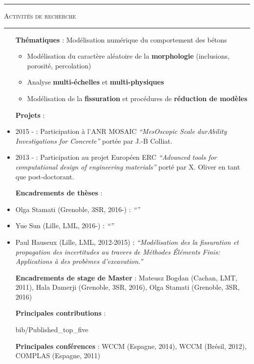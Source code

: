 \documentclass[a4paper,11pt]{article}
\newcommand{\titre}[1]{
  \begin{center}
    \rule{0.4\textwidth}{0.5pt}
    \par\vspace{0.1cm}
    \textsc{\large #1}
    \par\vspace{-0.2cm}
    \par\noindent\rule{0.4\textwidth}{0.5pt}
  \end{center}
}
\begin{document}
\newpage
\titre{Activités de recherche}
\begin{itemize}
  \item[\textbf{Thématiques}] : Modélisation numérique du comportement des bétons
    \begin{itemize}
    \item Modélisation du caractère aléatoire de la \textbf{morphologie} (inclusions, porosité, percolation)
    \item Analyse \textbf{multi-échelles} et \textbf{multi-physiques}
    \item Modélisation de la \textbf{fissuration} et procédures de \textbf{réduction de modèles}
    \end{itemize}
  \item[\textbf{Projets}] :
  \item 2015 - : Participation à l'ANR MOSAIC \textit{``MesOscopic Scale durAbility Investigations for Concrete''} portée par J.-B Colliat.
  \item 2013 - : Participation au projet Européen ERC \textit{``Advanced tools for computational design of engineering materials''} porté par X. Oliver en tant que post-doctorant.
  \item[\textbf{Encadrements de thèses}] :
  \item Olga Stamati (Grenoble, 3SR, 2016-) : \textit{``''}
  \item Yue Sun (Lille, LML, 2016-) : \textit{``''}
  \item Paul Hauseux (Lille, LML, 2012-2015) : \textit{``Modélisation des la fissuration et propagation des incertitudes au travers de Méthodes Éléments Finis: Applications à des probèmes d'excavation.''}
  \item[\textbf{Encadrements de stage de Master}] : Mateusz Bogdan (Cachan, LMT, 2011), Hala Damerji (Grenoble, 3SR, 2016), Olga Stamati (Grenoble, 3SR, 2016)
  \item[\textbf{Principales contributions}] :
    \begin{btSect}{bib/Published_top_five}
      \btPrintAll
    \end{btSect}
  \item[\textbf{Principales conférences}] : WCCM (Espagne, 2014), WCCM (Brésil, 2012), COMPLAS (Espagne, 2011)
\end{itemize}
\vfill      
\end{document}
